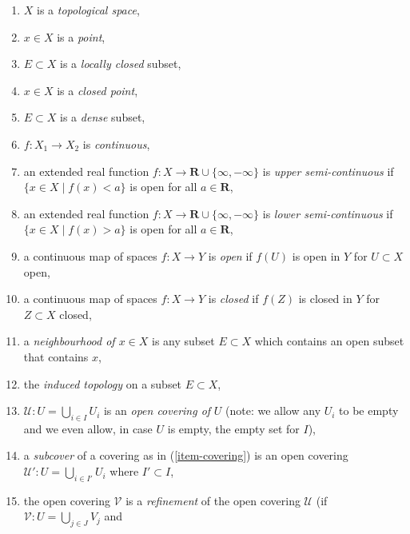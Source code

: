 \begin{enumerate}
\item
\label{topology-item-space}
$X$ is a {\it topological space},
\item
\label{topology-item-point}
$x\in X$ is a {\it point},
\item
\label{topology-item-locally-closed}
$E \subset X$ is a {\it locally closed} subset,
\item
\label{topology-item-closed-point}
$x\in X$ is a {\it closed point},
\item
\label{topology-item-dense}
$E \subset X$ is a {\it dense} subset,
\item
\label{topology-item-continuous}
$f : X_1 \to X_2$ is {\it continuous},
\item
\label{topology-item-upper-semi-continuous}
an extended real function $f : X \to \mathbf{R} \cup \{\infty, -\infty\}$
is {\it upper semi-continuous} if $\{x \in X \mid f(x) < a\}$ is open for
all $a \in \mathbf{R}$,
\item
\label{topology-item-lower-semi-continuous}
an extended real function $f : X \to \mathbf{R} \cup \{\infty, -\infty\}$
is {\it lower semi-continuous} if $\{x \in X \mid f(x) > a\}$ is open for
all $a \in \mathbf{R}$,
\item a continuous map of spaces $f : X \to Y$ is
{\it open} if $f(U)$ is open in $Y$ for $U \subset X$ open,
\item a continuous map of spaces $f : X \to Y$ is
{\it closed} if $f(Z)$ is closed in $Y$ for $Z \subset X$ closed,
\item
\label{topology-item-neighbourhood}
a {\it neighbourhood of $x \in X$} is any subset
$E \subset X$ which contains an open subset that
contains $x$,
\item
\label{topology-item-induced-topology}
the {\it induced topology} on a subset $E \subset X$,
\item
\label{topology-item-covering}
$\mathcal{U} : U = \bigcup_{i \in I} U_i$ is an
{\it open covering of} $U$ (note: we allow any $U_i$ to be empty
and we even allow, in case $U$ is empty, the empty set for $I$),
\item
\label{topology-item-subcover}
a {\it subcover} of a covering as in (\ref{item-covering})
is an open covering $\mathcal{U}' : U = \bigcup_{i \in I'} U_i$
where $I' \subset I$,
\item
\label{topology-item-refinement}
the open covering $\mathcal{V}$ is a {\it refinement}
of the open covering $\mathcal{U}$ (if
$\mathcal{V} : U = \bigcup_{j \in J} V_j$ and

\end{enumerate}
